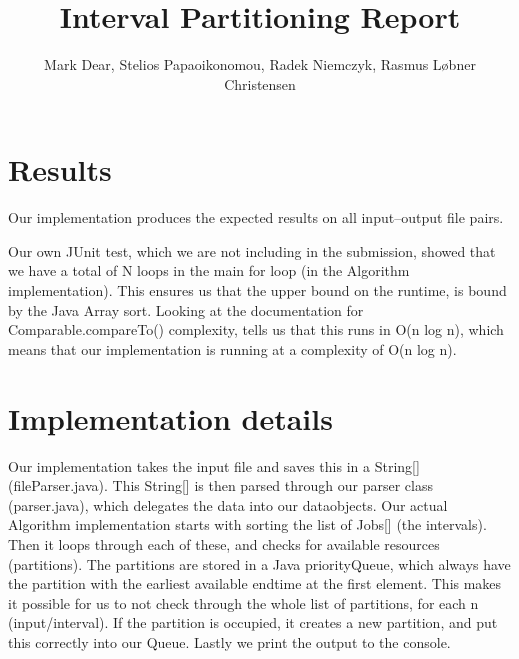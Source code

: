 \documentclass{tufte-handout}
\title{Interval Partitioning Report}
\author{Mark Dear, Stelios Papaoikonomou, Radek Niemczyk, Rasmus
Løbner Christensen}
\begin{document}
  \maketitle

  \section{Results}

  Our implementation produces the expected results on all
  input--output file pairs.
  
  Our own JUnit test, which we are not including in the submission, showed that we have a total of N loops in the main
  for loop (in the Algorithm implementation). This ensures us that the upper bound on the runtime, is bound by the Java Array sort.
  Looking at the documentation for Comparable.compareTo() complexity, tells us that this runs in O(n log n), which means that our
  implementation is running at a complexity of O(n log n).

  \section{Implementation details}

  Our implementation takes the input file and saves this in a String[] (fileParser.java). This String[] is then parsed
  through our parser class (parser.java), which delegates the data into our dataobjects.
  Our actual Algorithm implementation starts with sorting the list of Jobs[] (the intervals). Then it loops through each of these,
  and checks for available resources (partitions). The partitions are stored in a Java priorityQueue, which always have the partition
  with the earliest available endtime at the first element. This makes it possible for us to not check through the whole list of partitions,
  for each n (input/interval). If the partition is occupied, it creates a new partition, and put this correctly into our Queue.
  Lastly we print the output to the console.
  
\end{document}
